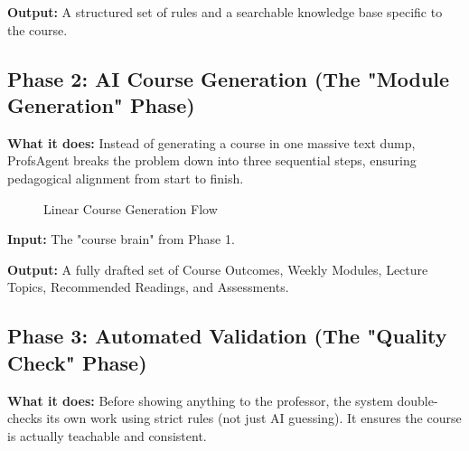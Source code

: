 \documentclass[11pt,a4paper]{article}
\begin{document}
\textbf{Output:} A structured set of rules and a searchable knowledge base specific to the course.

\subsection*{Phase 2: AI Course Generation (The "Module Generation" Phase)}
\textbf{What it does:} Instead of generating a course in one massive text dump, ProfsAgent breaks the problem down into three sequential steps, ensuring pedagogical alignment from start to finish.

\begin{figure}[H]
\centering
{}
\caption{Linear Course Generation Flow}
\label{fig:generation}
\end{figure}

\textbf{Input:} The "course brain" from Phase 1.

\textbf{Output:} A fully drafted set of Course Outcomes, Weekly Modules, Lecture Topics, Recommended Readings, and Assessments.

\clearpage

\subsection*{Phase 3: Automated Validation (The "Quality Check" Phase)}

\textbf{What it does:} Before showing anything to the professor, the system double-checks its own work using strict rules (not just AI guessing). It ensures the course is actually teachable and consistent.
\end{document}

